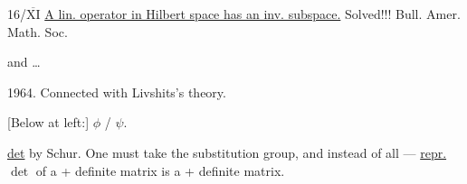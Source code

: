 16/\underline{$\overline{\mathrm{XI}}$}
\underline{A lin. operator in Hilbert space has an inv. subspace.}
Solved!!!
Bull. Amer. Math. Soc.
\par\noindent\begin{minipage}{\linewidth}
\uwave{\textcolor{orange!65!black}{Lui de Brange}} and \ldots
{}
\end{minipage}\par
1964.
Connected with Livshits's theory.
\par\noindent\begin{minipage}{\linewidth}
[Below at left:] \textcolor{orange!65!black}{$\phi$ / $\psi$}.
\end{minipage}\par
\underline{det} by Schur.
One must take the substitution group, and instead of all --- \underline{repr.}
$\det$ of a + definite matrix is a + definite matrix.

